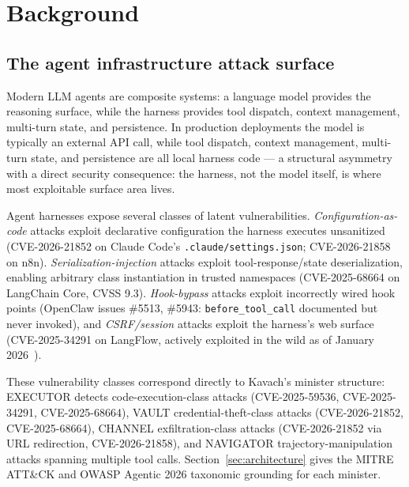 
\section{Background}
\label{sec:background}

\subsection{The agent infrastructure attack surface}

Modern LLM agents are composite systems: a language model provides the
reasoning surface, while the harness provides tool dispatch, context
management, multi-turn state, and persistence. In production deployments
the model is typically an external API call, while tool dispatch, context
management, multi-turn state, and persistence are all local harness
code --- a structural asymmetry with a direct security consequence: the
harness, not the model itself, is where most exploitable surface area
lives.

Agent harnesses expose several classes of latent vulnerabilities.
\emph{Configuration-as-code} attacks exploit declarative configuration the
harness executes unsanitized (CVE-2026-21852 on Claude Code's
\texttt{.claude/settings.json}; CVE-2026-21858 on n8n).
\emph{Serialization-injection} attacks exploit tool-response/state
deserialization, enabling arbitrary class instantiation in trusted
namespaces (CVE-2025-68664 on LangChain Core, CVSS 9.3).
\emph{Hook-bypass} attacks exploit incorrectly wired hook points (OpenClaw
issues \#5513, \#5943: \texttt{before\_\allowbreak tool\_\allowbreak call}
documented but never invoked), and \emph{CSRF/session} attacks exploit the
harness's web
surface (CVE-2025-34291 on LangFlow, actively exploited in the wild as of
January 2026~\cite{crowdsec2026langflow}).

These vulnerability classes correspond directly to Kavach's minister
structure: EXECUTOR detects code-execution-class attacks (CVE-2025-59536,
CVE-2025-34291, CVE-2025-68664), VAULT credential-theft-class attacks
(CVE-2026-21852, CVE-2025-68664), CHANNEL exfiltration-class attacks
(CVE-2026-21852 via URL redirection, CVE-2026-21858), and NAVIGATOR
trajectory-manipulation attacks spanning multiple tool calls.
Section~\ref{sec:architecture} gives the MITRE ATT\&CK and OWASP Agentic
2026 taxonomic grounding for each minister.


